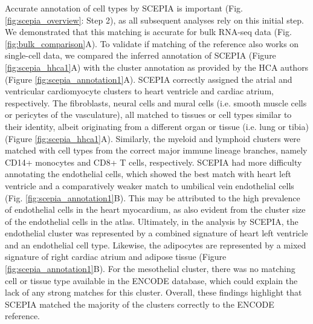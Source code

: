 Accurate annotation of cell types by SCEPIA is important (Fig. \ref{fig:scepia_overview}: Step 2), as all subsequent analyses rely on this initial step. We demonstrated that this matching is accurate for bulk RNA-seq data (Fig. \ref{fig:bulk_comparison}A). To validate if matching of the reference also works on single-cell data, we compared the inferred annotation of SCEPIA (Figure \ref{fig:scepia_hhca1}A) with the cluster annotation as provided by the HCA authors (Figure \ref{fig:scepia_annotation1}A). SCEPIA correctly assigned the atrial and ventricular cardiomyocyte clusters to heart ventricle and cardiac atrium, respectively. The fibroblasts, neural cells and mural cells (i.e. smooth muscle cells or pericytes of the vasculature), all matched to tissues or cell types similar to their identity, albeit originating from a different organ or tissue (i.e. lung or tibia) (Figure \ref{fig:scepia_hhca1}A). Similarly, the myeloid and lymphoid clusters were matched with cell types from the correct major immune lineage branches, namely CD14+ monocytes and CD8+ T cells, respectively. SCEPIA had more difficulty annotating the endothelial cells, which showed the best match with heart left ventricle and a comparatively weaker match to umbilical vein endothelial cells (Fig. \ref{fig:scepia_annotation1}B). This may be attributed to the high prevalence of endothelial cells in the heart myocardium, as also evident from the cluster size of the endothelial cells in the atlas. Ultimately, in the analysis by SCEPIA, the endothelial cluster was represented by a combined signature of heart left ventricle and an endothelial cell type. Likewise, the adipocytes are represented by a mixed signature of right cardiac atrium and adipose tissue (Figure \ref{fig:scepia_annotation1}B). For the mesothelial cluster, there was no matching cell or tissue type available in the ENCODE database, which could explain the lack of any strong matches for this cluster. Overall, these findings highlight that SCEPIA matched the majority of the clusters correctly to the ENCODE reference. 


